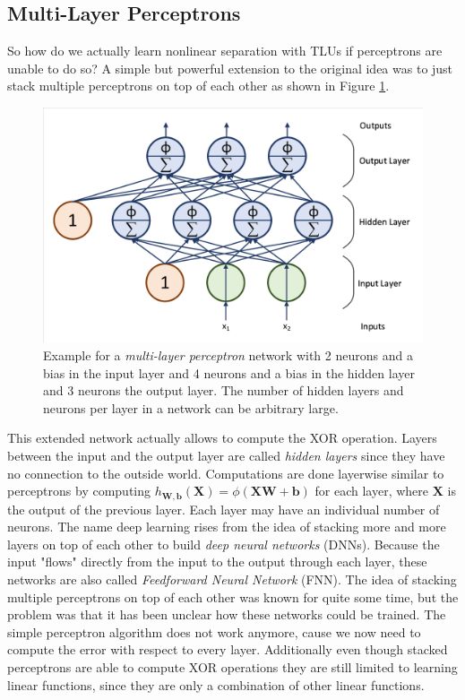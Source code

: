 \subsection{Multi-Layer Perceptrons} \label{ssec:MLPs}
So how do we actually learn nonlinear separation with TLUs if perceptrons are unable to do so? A simple but powerful extension to the original idea was to just stack multiple perceptrons on top of each other as shown in Figure \ref{fig:MLP}. 

\begin{figure}[ht]
  
  \begin{center}
      \includegraphics[trim=10px 10px 10px 10px, clip, width=0.8\columnwidth]{figures/deeplearning/MLP.pdf}
  \end{center}
  
  \caption[Multi-Layer Perceptron Example]{Example for a \textit{multi-layer perceptron} network with 2 neurons and a bias in the input layer and 4 neurons and a bias in the hidden layer and 3 neurons the output layer. The number of hidden layers and neurons per layer in a network can be arbitrary large.}
  \label{fig:MLP}
\end{figure}

This extended network actually allows to compute the XOR operation. Layers between the input and the output layer are called \textit{hidden layers} since they have no connection to the outside world. Computations are done layerwise similar to perceptrons by computing $h_{\mathbf{W}, \mathbf{b}}(\mathbf{X}) = \phi(\mathbf{XW} + \mathbf{b})$ for each layer, where $\mathbf{X}$ is the output of the previous layer. Each layer may have an individual number of neurons. The name deep learning rises from the idea of stacking more and more layers on top of each other to build \textit{deep neural networks} (DNNs). Because the input "flows" directly from the input to the output through each layer, these networks are also called \textit{Feedforward Neural Network} (FNN). The idea of stacking multiple perceptrons on top of each other was known for quite some time, but the problem was that it has been unclear how these networks could be trained. The simple perceptron algorithm does not work anymore, cause we now need to compute the error with respect to every layer. Additionally even though stacked perceptrons are able to compute XOR operations they are still limited to learning linear functions, since they are only a combination of other linear functions.

